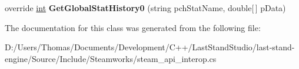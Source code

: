 \begin{DoxyCompactItemize}
\item 
\hypertarget{classValve_1_1Steamworks_1_1CSteamUserStats_ac00add7d004e81dea362ac3587a15189}{}override \hyperlink{SDL__thread_8h_a6a64f9be4433e4de6e2f2f548cf3c08e}{int} {\bfseries Get\+Global\+Stat\+History0} (string pch\+Stat\+Name, double\mbox{[}$\,$\mbox{]} p\+Data)\label{classValve_1_1Steamworks_1_1CSteamUserStats_ac00add7d004e81dea362ac3587a15189}

\end{DoxyCompactItemize}


The documentation for this class was generated from the following file\+:\begin{DoxyCompactItemize}
\item 
D\+:/\+Users/\+Thomas/\+Documents/\+Development/\+C++/\+Last\+Stand\+Studio/last-\/stand-\/engine/\+Source/\+Include/\+Steamworks/steam\+\_\+api\+\_\+interop.\+cs\end{DoxyCompactItemize}
